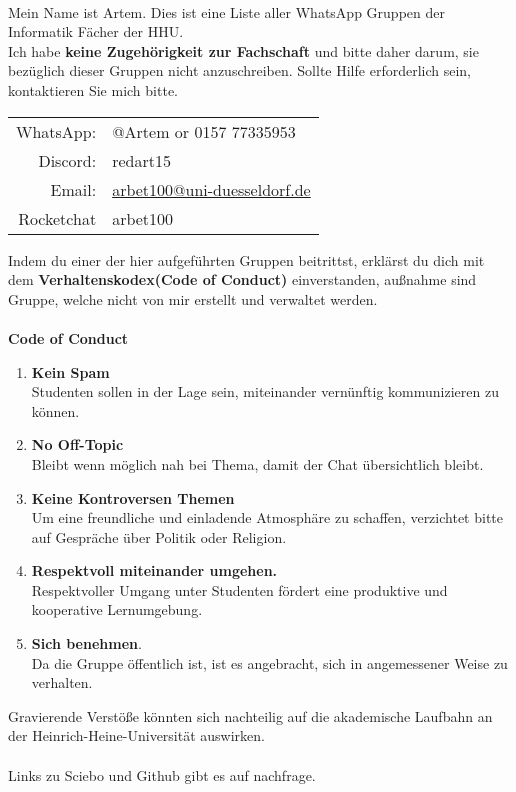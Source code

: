 \documentclass[a4paper,11pt]{article}
\newcommand{\header}[1]{%
    \fancyhead{}%
    \fancyhead[C]{\colorbox{headercolor}{\parbox{\dimexpr\textwidth-2\fboxsep}{\centering\textbf{WhatsApp Kontakte}}}}%
}
\newcommand{\fooder}[1]{
    \fancyfoot{}%
    \fancyfoot[C]{\colorbox{headercolor}{%
        \parbox{\dimexpr\textwidth-2\fboxsep}{%
            \centering%
            Infos
            }%
        }%
    }%
}%
\newcommand{\sectionstarInto}[1]{%
  \vspace{3cm}
  \section*{#1}
  \header{#1} %
  \phantomsection
  \addcontentsline{toc}{section}{#1}
  \fooder{#1}
}
\begin{document}
\let\oldclearpage\clearpage

\renewcommand{\clearpage}{}

\newpage
\noindent{}\\
Mein Name ist Artem. Dies ist eine Liste aller WhatsApp Gruppen der Informatik Fächer der HHU.\\
\noindent Ich habe \textbf{keine Zugehörigkeit zur Fachschaft} und bitte daher darum, sie bezüglich dieser Gruppen nicht anzuschreiben. Sollte Hilfe erforderlich sein, kontaktieren Sie mich bitte.

\begin{center}
\begin{tabular}{rl}
     WhatsApp: & @Artem or 0157 77335953\\
     Discord: & redart15\\
     Email: & \href{mailto:arbet100@uni-duesseldorf.de}{arbet100@uni-duesseldorf.de}\\
     Rocketchat & arbet100\\
\end{tabular}
\end{center}

\noindent Indem du einer der hier aufgeführten Gruppen beitrittst, erklärst du dich mit dem \textbf{Verhaltenskodex(Code of Conduct)} einverstanden, außnahme sind Gruppe, welche nicht von mir erstellt und verwaltet werden.
\\
\\\large{\textbf{Code of Conduct}}
\begin{enumerate}
    \item \textbf{Kein Spam}\\
    Studenten sollen in der Lage sein, miteinander vernünftig kommunizieren zu können.
    \item \textbf{No Off-Topic}\\
    Bleibt wenn möglich nah bei Thema, damit der Chat übersichtlich bleibt.
    \item \textbf{Keine Kontroversen Themen}\\
    Um eine freundliche und einladende Atmosphäre zu schaffen, verzichtet bitte auf Gespräche über Politik oder Religion.
    \item \textbf{Respektvoll miteinander umgehen.}\\
    Respektvoller Umgang unter Studenten fördert eine produktive und kooperative Lernumgebung.
    \item \textbf{Sich benehmen}.\\
    Da die Gruppe öffentlich ist, ist es angebracht, sich in angemessener Weise zu verhalten.
\end{enumerate}
Gravierende Verstöße könnten sich nachteilig auf die akademische Laufbahn an der Heinrich-Heine-Universität auswirken.\\\\Links zu Sciebo und Github gibt es auf nachfrage.
\end{document}
